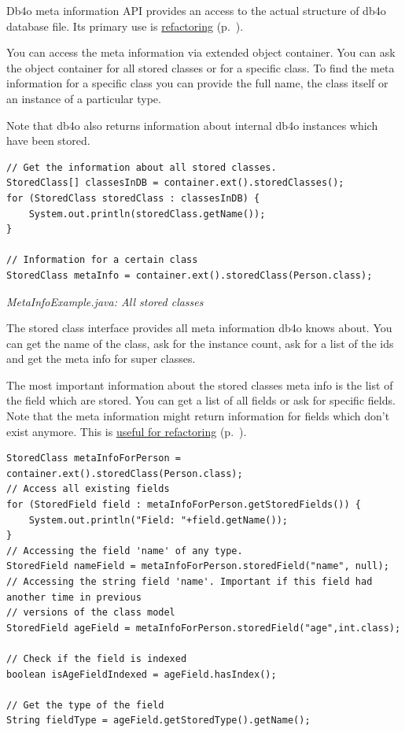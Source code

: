 Db4o meta information API provides an access to the actual structure of db4o database file. Its primary use is \hyperref[ref:advanced-topics-refactoring-and-schema-evolution]{refactoring} (p.~\pageref{ref:advanced-topics-refactoring-and-schema-evolution}).

You can access the meta information via extended object container. You can ask the object container for all stored classes or for a specific class. To find the meta information for a specific class you can provide the full name, the class itself or an instance of a particular type.

Note that db4o also returns information about internal db4o instances which have been stored.

\begin{lstlisting}
// Get the information about all stored classes.
StoredClass[] classesInDB = container.ext().storedClasses();
for (StoredClass storedClass : classesInDB) {
    System.out.println(storedClass.getName());
}

// Information for a certain class
StoredClass metaInfo = container.ext().storedClass(Person.class);
\end{lstlisting}

{\small\itshape MetaInfoExample.java: All stored classes\par}
\medskip

The stored class interface provides all meta information db4o knows about. You can get the name of the class, ask for the instance count, ask for a list of the ids and get the meta info for super classes.

The most important information about the stored classes meta info is the list of the field which are stored. You can get a list of all fields or ask for specific fields. Note that the meta information might return information for fields which don't exist anymore. This is \hyperref[ref:advanced-topics-refactoring-and-schema-evolution-field-type-change]{useful for refactoring} (p.~\pageref{ref:advanced-topics-refactoring-and-schema-evolution-field-type-change}).

\begin{lstlisting}
StoredClass metaInfoForPerson = container.ext().storedClass(Person.class);
// Access all existing fields
for (StoredField field : metaInfoForPerson.getStoredFields()) {
    System.out.println("Field: "+field.getName());
}
// Accessing the field 'name' of any type.
StoredField nameField = metaInfoForPerson.storedField("name", null);
// Accessing the string field 'name'. Important if this field had another time in previous
// versions of the class model
StoredField ageField = metaInfoForPerson.storedField("age",int.class);

// Check if the field is indexed
boolean isAgeFieldIndexed = ageField.hasIndex();

// Get the type of the field
String fieldType = ageField.getStoredType().getName();
\end{lstlisting}

